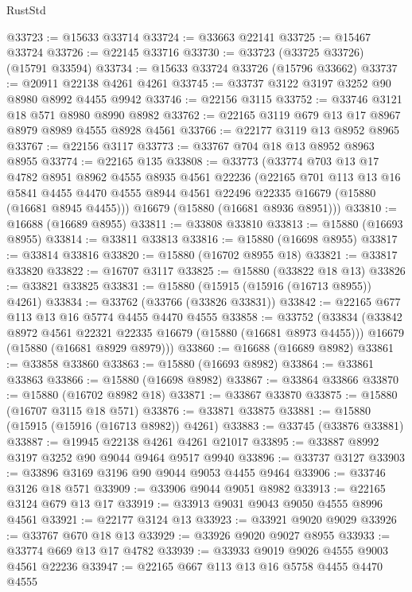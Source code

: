 \begin{lexlean}{RustStd}
\begin{coremodule}
@33723 := @15633 @33714
@33724 := @33663 @22141
@33725 := @15467 @33724
@33726 := @22145 @33716
@33730 := @33723 (@33725 @33726) (@15791 @33594)
@33734 := @15633 @33724 @33726 (@15796 @33662)
@33737 := @20911 @22138 @4261 @4261
@33745 := @33737 @3122 @3197 @3252 @90 @8980 @8992 @4455 @9942
@33746 := @22156 @3115
@33752 := @33746 @3121 @18 @571 @8980 @8990 @8982
@33762 := @22165 @3119 @679 @13 @17 @8967 @8979 @8989 @4555 @8928 @4561
@33766 := @22177 @3119 @13 @8952 @8965
@33767 := @22156 @3117
@33773 := @33767 @704 @18 @13 @8952 @8963 @8955
@33774 := @22165 @135
@33808 := @33773
    (@33774
      @703
      @13
      @17
      @4782
      @8951
      @8962
      @4555
      @8935
      @4561
      @22236
      (@22165
        @701
        @113
        @13
        @16
        @5841
        @4455
        @4470
        @4555
        @8944
        @4561
        @22496
        @22335
        @16679
        (@15880 (@16681 @8945 @4455)))
      @16679
      (@15880 (@16681 @8936 @8951)))
@33810 := @16688 (@16689 @8955)
@33811 := @33808 @33810
@33813 := @15880 (@16693 @8955)
@33814 := @33811 @33813
@33816 := @15880 (@16698 @8955)
@33817 := @33814 @33816
@33820 := @15880 (@16702 @8955 @18)
@33821 := @33817 @33820
@33822 := @16707 @3117
@33825 := @15880 (@33822 @18 @13)
@33826 := @33821 @33825
@33831 := @15880 (@15915 (@15916 (@16713 @8955)) @4261)
@33834 := @33762 (@33766 (@33826 @33831))
@33842 := @22165 @677 @113 @13 @16 @5774 @4455 @4470 @4555
@33858 := @33752
    (@33834
      (@33842 @8972 @4561 @22321 @22335 @16679 (@15880 (@16681 @8973 @4455)))
      @16679
      (@15880 (@16681 @8929 @8979)))
@33860 := @16688 (@16689 @8982)
@33861 := @33858 @33860
@33863 := @15880 (@16693 @8982)
@33864 := @33861 @33863
@33866 := @15880 (@16698 @8982)
@33867 := @33864 @33866
@33870 := @15880 (@16702 @8982 @18)
@33871 := @33867 @33870
@33875 := @15880 (@16707 @3115 @18 @571)
@33876 := @33871 @33875
@33881 := @15880 (@15915 (@15916 (@16713 @8982)) @4261)
@33883 := @33745 (@33876 @33881)
@33887 := @19945 @22138 @4261 @4261 @21017
@33895 := @33887 @8992 @3197 @3252 @90 @9044 @9464 @9517 @9940
@33896 := @33737 @3127
@33903 := @33896 @3169 @3196 @90 @9044 @9053 @4455 @9464
@33906 := @33746 @3126 @18 @571
@33909 := @33906 @9044 @9051 @8982
@33913 := @22165 @3124 @679 @13 @17
@33919 := @33913 @9031 @9043 @9050 @4555 @8996 @4561
@33921 := @22177 @3124 @13
@33923 := @33921 @9020 @9029
@33926 := @33767 @670 @18 @13
@33929 := @33926 @9020 @9027 @8955
@33933 := @33774 @669 @13 @17 @4782
@33939 := @33933 @9019 @9026 @4555 @9003 @4561 @22236
@33947 := @22165 @667 @113 @13 @16 @5758 @4455 @4470 @4555

\end{coremodule}
\end{lexlean}
